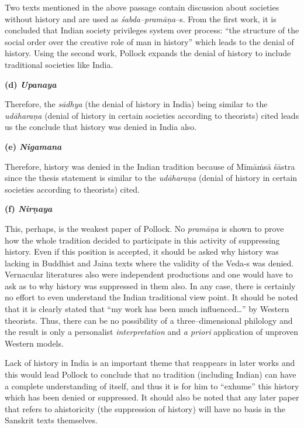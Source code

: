Two texts mentioned in the above passage contain discussion about societies without history and are used as \textit{śabda–pramāṇa}–s. From the first work, it is concluded that Indian society privileges system over process: “the structure of the social order over the creative role of man in history” which leads to the denial of history. Using the second work, Pollock expands the denial of history to include traditional societies like India.

\textbf{(d) \textit{Upanaya}}

Therefore, the \textit{sādhya} (the denial of history in India) being similar to the \textit{udāharaṇa} (denial of history in certain societies according to theorists) cited leads us the conclude that history was denied in India also.

\textbf{(e) \textit{Nigamana}}

Therefore, history was denied in the Indian tradition because of Mīmāṁsā śāstra since the thesis statement is similar to the \textit{udāharaṇa} (denial of history in certain societies according to theorists) cited.

\textbf{(f) \textit{Nirṇaya}}

This, perhaps, is the weakest paper of Pollock. No \textit{pramāṇa} is shown to prove how the whole tradition decided to participate in this activity of suppressing history. Even if this position is accepted, it should be asked why history was lacking in Buddhist and Jaina texts where the validity of the Veda-s was denied. Vernacular literatures also were independent productions and one would have to ask as to why history was suppressed in them also. In any case, there is certainly no effort to even understand the Indian traditional view point. It should be noted that it is clearly stated that “my work has been much influenced…” by Western theorists. Thus, there can be no possibility of a three–dimensional philology and the result is only a personalist \textit{interpretation} and \textit{a priori} application of unproven Western models.

Lack of history in India is an important theme that reappears in later works and this would lead Pollock to conclude that no tradition (including Indian) can have a complete understanding of itself, and thus it is for him to “exhume” this history which has been denied or suppressed. It should also be noted that any later paper that refers to ahistoricity (the suppression of history) will have no basis in the Sanskrit texts themselves.

